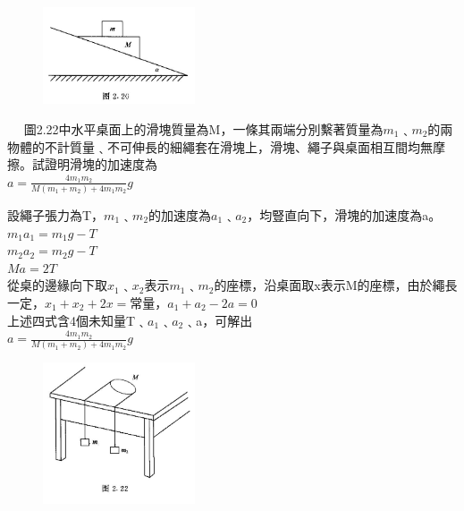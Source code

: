 \documentclass[cn,10pt,math=newtx,chinesefont=founder]{../elegantbook}
\begin{document}
\begin{figure}[htbp]
\flushright
\includegraphics[width=0.4\textwidth]{image/2.20.JPG}
\end{figure}

\newpage


\begin{example}　
    圖2.22中水平桌面上的滑塊質量為M，一條其兩端分別繫著質量為$m_1$﹑$m_2$的兩物體的不計質量﹑不可伸長的細繩套在滑塊上，滑塊、繩子與桌面相互間均無摩擦。試證明滑塊的加速度為\\$a = \frac{4m_1m_2}{M(m_1+m_2)+4m_1m_2}g$
    
    \rightline{[2.1.26]}
    
\end{example}

\begin{solution}
設繩子張力為T，$m_1$﹑$m_2$的加速度為$a_1$﹑$a_2$，均豎直向下，滑塊的加速度為a。\\
$m_1a_1 = m_1g - T$\\
$m_2a_2 = m_2g - T$\\
$Ma = 2T$\\
從桌的邊緣向下取$x_1$﹑$x_2$表示$m_1$﹑$m_2$的座標，沿桌面取x表示M的座標，由於繩長一定，$x_1+x_2+2x = $常量，$a_1+a_2-2a = 0$\\
上述四式含4個未知量T﹑$a_1$﹑$a_2$﹑a，可解出\\
$a = \frac{4m_1m_2}{M(m_1+m_2)+4m_1m_2}g$
\end{solution}

\begin{figure}[htbp]
\flushright
\includegraphics[width=0.4\textwidth]{image/2.22.JPG}
\end{figure}
\end{document}
